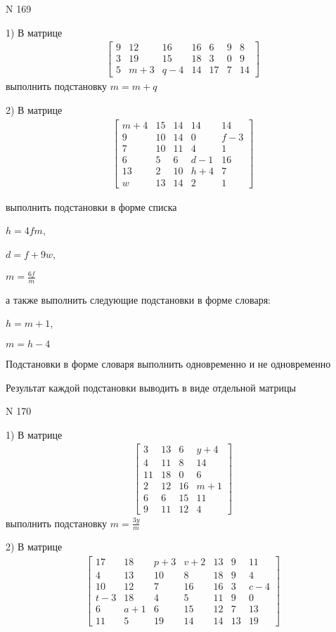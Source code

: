 \documentclass[11pt]{report}
\begin{document}
\newpage
N 169


    1) В матрице
\begin{align*}
\left[\begin{matrix}9 & 12 & 16 & 16 & 6 & 9 & 8\\3 & 19 & 15 & 18 & 3 & 0 & 9\\5 & m + 3 & q - 4 & 14 & 17 & 7 & 14\end{matrix}\right]
\end{align*}
выполнить подстановку $m=m + q$


    2) В матрице
\begin{align*}
\left[\begin{matrix}m + 4 & 15 & 14 & 14 & 14\\9 & 10 & 14 & 0 & f - 3\\7 & 10 & 11 & 4 & 1\\6 & 5 & 6 & d - 1 & 16\\13 & 2 & 10 & h + 4 & 7\\w & 13 & 14 & 2 & 1\end{matrix}\right]
\end{align*}

выполнить подстановки в форме списка

$h=4 f m$,

$d=f + 9 w$,

$m=\frac{6 f}{m}$

а также выполнить следующие подстановки в форме словаря:

$h=m + 1$,

$m=h - 4$


    Подстановки в форме словаря выполнить одновременно и не одновременно


    Результат каждой подстановки выводить в виде отдельной матрицы

\newpage
N 170


    1) В матрице
\begin{align*}
\left[\begin{matrix}3 & 13 & 6 & y + 4\\4 & 11 & 8 & 14\\11 & 18 & 0 & 6\\2 & 12 & 16 & m + 1\\6 & 6 & 15 & 11\\9 & 11 & 12 & 4\end{matrix}\right]
\end{align*}
выполнить подстановку $m=\frac{3 y}{m}$


    2) В матрице
\begin{align*}
\left[\begin{matrix}17 & 18 & p + 3 & v + 2 & 13 & 9 & 11\\4 & 13 & 10 & 8 & 18 & 9 & 4\\10 & 12 & 7 & 16 & 16 & 3 & c - 4\\t - 3 & 18 & 4 & 5 & 11 & 9 & 0\\6 & a + 1 & 6 & 15 & 12 & 7 & 13\\11 & 5 & 19 & 14 & 14 & 13 & 19\end{matrix}\right]
\end{align*}
\end{document}
